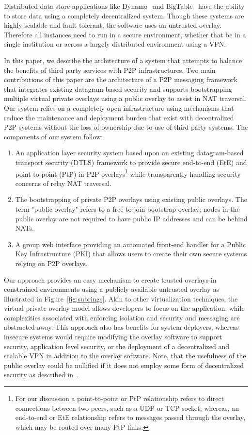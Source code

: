 \documentclass[conference]{IEEEtran}
\begin{document}
Distributed data store applications like Dynamo~\cite{dynamo} and
BigTable~\cite{bigtable} have the ability to store data using a completely
decentralized system.  Though these systems are highly scalable and fault
tolerant, the software uses an untrusted overlay.  Therefore all instances
need to run in a secure environment, whether that be in a single institution
or across a largely distributed environment using a VPN.

In this paper, we describe the architecture of a system that attempts
to balance the benefits of third party services with P2P infrastructures.
Two main contributions of this paper are the architecture of a P2P messaging
framework that integrates existing datagram-based security and supports
bootstrapping multiple virtual private overlays using a public overlay to
assist in NAT traversal.
Our system relies on a completely open infrastructure using mechanisms that
reduce the maintenance and deployment burden that exist with decentralized
P2P systems without the loss of ownership due to use of third party systems.
The components of our system follow:
\begin{enumerate}
\setlength{\itemsep}{0pt}
\setlength{\parskip}{0pt}
\item An application layer security system based upon an existing datagram-based
transport security (DTLS) framework to provide secure end-to-end (EtE) and
point-to-point (PtP) in P2P overlays\footnote{For our discussion a point-to-point
or PtP relationship refers to direct connections between two peers, such as a UDP
or TCP socket; whereas, an end-to-end or EtE relationship refers to messages passed
through the overlay, which may be routed over many PtP links.}
 while transparently handling security
concerns of relay NAT traversal.
\item The bootstrapping of private P2P overlays using existing public overlays.
The term "public overlay" refers to a free-to-join bootstrap overlay; nodes in
the public overlay are not required to have public IP addresses and can be
behind NATs.
\item A group web interface providing an automated front-end handler for a 
Public Key Infrastructure (PKI) that allows users to create their own secure
systems relying on P2P overlays.
\end{enumerate}

Our approach provides an easy mechanism to create trusted overlays in
constrained environments using a publicly available untrusted overlay as
illustrated in Figure~\ref{fig:subrings}.  Akin to other virtualization
techniques, the virtual private overlay model allows developers to focus
on the application, while complexities associated with enforcing isolation
and security and messaging are abstracted away.
This approach also has benefits for system deployers, whereas insecure systems
would require modifying the overlay software to support security, application
level security, or the deployment of a decentralized and scalable VPN in
addition to the overlay software.  Note, that the usefulness of the public
overlay could be nullified if it does not employ some form of decentralized
security as described in~\cite{secure_routing}.
\end{document}
